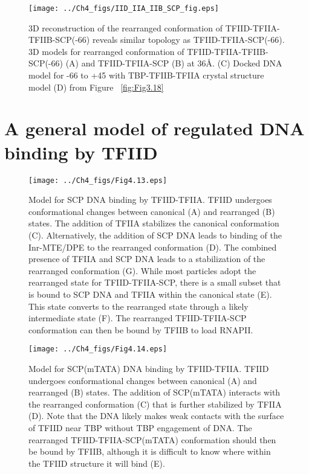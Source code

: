 \begin{figure}
\centering
\texttt{[image: ../Ch4\_figs/IID\_IIA\_IIB\_SCP\_fig.eps]}
\caption[3D reconstruction of the rearranged conformation of TFIID-TFIIA-TFIIB-SCP(-66) reveals similar topology as TFIID-TFIIA-SCP(-66)]{3D reconstruction of the rearranged conformation of TFIID-TFIIA-TFIIB-SCP(-66) reveals similar topology as TFIID-TFIIA-SCP(-66). 3D models for rearranged conformation of TFIID-TFIIA-TFIIB-SCP(-66) (A) and TFIID-TFIIA-SCP (B) at 36\AA. (C) Docked DNA model for -66 to +45 with TBP-TFIIB-TFIIA crystal structure model (D) from Figure ~\ref{fig:Fig3.18} }
\label{fig:IIB_cryo}
\end{figure}

\section{A general model of regulated DNA binding by TFIID}
\begin{figure}
\centering
\texttt{[image: ../Ch4\_figs/Fig4.13.eps]}
\caption[Model for SCP DNA binding by TFIID-TFIIA]{Model for SCP DNA binding by TFIID-TFIIA. TFIID undergoes conformational changes between canonical (A) and rearranged (B) states. The addition of TFIIA stabilizes the canonical conformation (C). Alternatively, the addition of SCP DNA leads to binding of the Inr-MTE/DPE to the rearranged conformation (D).  The combined presence of TFIIA and SCP DNA leads to a stabilization of the rearranged conformation (G).  While most particles adopt the rearranged state for TFIID-TFIIA-SCP, there is a small subset that is bound to SCP DNA and TFIIA within the canonical state (E). This state converts to the rearranged state through a likely intermediate state (F). The rearranged TFIID-TFIIA-SCP conformation can then be bound by TFIIB to load RNAPII.}
\label{fig:Fig4.13}
\end{figure}



\begin{figure}
\centering
\texttt{[image: ../Ch4\_figs/Fig4.14.eps]}
\caption[Model for SCP(mTATA) DNA binding by TFIID-TFIIA]{Model for SCP(mTATA) DNA binding by TFIID-TFIIA. TFIID undergoes conformational changes between canonical (A) and rearranged (B) states. The addition of SCP(mTATA) interacts with the rearranged conformation (C) that is further stabilized by TFIIA (D). Note that the DNA likely makes weak contacts with the surface of TFIID near TBP without TBP engagement of DNA. The rearranged TFIID-TFIIA-SCP(mTATA) conformation should then be bound by TFIIB, although it is difficult to know where within the TFIID structure it will bind (E).}
\label{fig:Fig4.14}
\end{figure}
